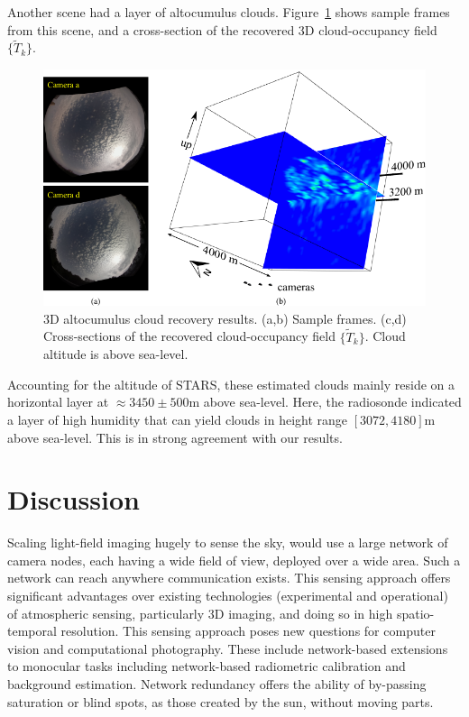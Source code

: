 \documentclass[runningheads]{llncs}
\begin{document}
Another scene had a layer of altocumulus clouds. Figure~\ref{fig:alto} shows sample frames from this scene, and a cross-section of the recovered 3D cloud-occupancy field $\{\tilde T_k\}$.
\begin{figure}[t!]
\begin{center}
   \includegraphics[width=1\linewidth]{figures/altos_reconstructions.pdf}
\end{center}
   \vspace{-0.6cm}
   \caption{3D altocumulus cloud recovery results. (a,b) Sample frames.
   (c,d)  Cross-sections of the recovered cloud-occupancy field $\{\tilde T_k\}$. Cloud
   altitude is above sea-level.}
\label{fig:alto}
\end{figure}
Accounting for the altitude of STARS, these estimated clouds mainly reside on a horizontal layer at $\approx 3450\pm500$m above sea-level. Here, the radiosonde indicated a layer of high humidity that can yield clouds in height range $[3072,4180]$m above sea-level. This is in strong agreement with our results.



\section{Discussion}
\label{sec:discuss}

Scaling light-field imaging hugely to sense the sky, would use  a large network of camera nodes, each having a wide field of view, deployed over a wide area. Such a network can reach anywhere communication exists. This sensing approach offers significant advantages over existing technologies (experimental and operational) of atmospheric sensing, particularly  3D imaging, and doing so in high spatio-temporal resolution. This sensing approach poses new questions for computer vision and computational photography. These include network-based extensions to monocular tasks including network-based radiometric calibration and background estimation. Network redundancy offers the ability of by-passing saturation or blind spots, as those created by the sun, without moving parts.
\end{document}
